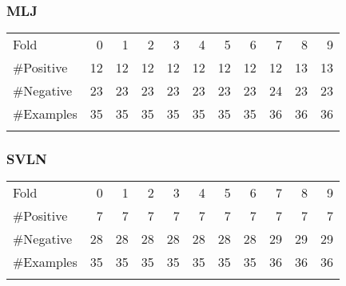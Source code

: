 \subsubsection{MLJ}

\begin{table}[htbp]
	\centering
		\begin{tabular}{l@{\qquad}*{10}{r}}
		\toprule
\addlinespace
			Fold &  0 &  1 &  2 &  3 &  4 &  5 &  6 &  7 &  8 &  9 \\
\addlinespace
\midrule
\addlinespace
\#Positive  & 12  & 12  &  12 &  12 &  12 &  12 &  12 &  12 & 13 & 13 \\
\#Negative  & 23 & 23 & 23 & 23 & 23 & 23 & 23 & 24 & 23 & 23 \\
\#Examples  & 35 & 35 & 35 & 35 & 35 & 35 & 35 & 36 & 36 & 36 \\
\addlinespace
\bottomrule
		\end{tabular}
	\label{tab:MLJ}
\end{table}



\subsubsection{SVLN}

\begin{table}[htbp]
	\centering
		\begin{tabular}{l@{\qquad}*{10}{r}}
		\toprule
\addlinespace
			Fold &  0 &  1 &  2 &  3 &  4 &  5 &  6 &  7 &  8 &  9 \\
\addlinespace
\midrule
\addlinespace
\#Positive & 7  & 7  &  7 &  7 &  7 &  7 &  7 &  7 &  7 &  7 \\
\#Negative & 28 & 28 & 28 & 28 & 28 & 28 & 28 & 29 & 29 & 29 \\
\#Examples & 35 & 35 & 35 & 35 & 35 & 35 & 35 & 36 & 36 & 36 \\
\addlinespace
\bottomrule
		\end{tabular}
	\label{tab:SVLN}
\end{table}
